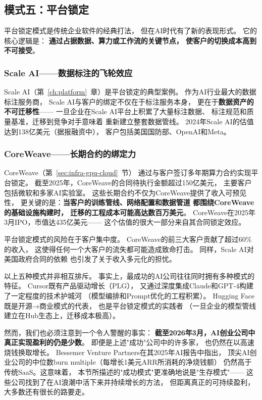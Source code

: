 \subsection{模式五：平台锁定}

平台锁定模式是传统企业软件的经典打法，
但在AI时代有了新的表现形式。
它的核心逻辑是：
\textbf{通过占据数据、算力或工作流的关键节点，
使客户的切换成本高到不可接受}。

\subsubsection{Scale AI——数据标注的飞轮效应}
Scale AI（第~\ref{ch:platform}~章）是平台锁定的典型案例。
作为AI行业最大的数据标注服务商，
Scale AI与客户的绑定不仅在于标注服务本身，
更在于\textbf{数据资产的不可迁移性}——
一旦企业在Scale AI平台上积累了大量标注数据、
标注规范和质量基准，迁移到竞争对手意味着
重新建立整套数据管线。
2024年Scale AI的估值达到138亿美元（据报融资中），
客户包括美国国防部、OpenAI和Meta。

\subsubsection{CoreWeave——长期合约的绑定力}
CoreWeave（第~\ref{sec:infra-gpu-cloud}~节）
通过与客户签订多年期算力合约实现平台锁定。
截至2025年，CoreWeave的合同待执行金额超过150亿美元，
主要客户包括微软和多家AI实验室。
这些长期合约不仅为CoreWeave提供了收入可预见性，
更关键的是：\textbf{当客户的训练管线、网络配置和数据管道
都围绕CoreWeave的基础设施构建时，
迁移的工程成本可能高达数百万美元}。
CoreWeave在2025年3月IPO，市值达435亿美元——
这个估值的很大一部分来自其合同锁定效应。

平台锁定模式的风险在于客户集中度。
CoreWeave的前三大客户贡献了超过60\%的收入，
这使得任何一个大客户的流失都可能造成致命打击。
同样，Scale AI对美国政府合同的依赖
也引发了关于收入多元化的担忧。

\bigskip

以上五种模式并非相互排斥。
事实上，最成功的AI公司往往同时拥有多种模式的特征。
Cursor既有产品驱动增长（PLG），
又通过深度集成Claude和GPT-4构建了一定程度的技术护城河
（模型编排和Prompt优化的工程积累）。
Hugging Face既是开源→商业模式的代表，
也是平台锁定模式的实践者
（一旦企业的模型管线建立在Hub生态上，迁移成本极高）。

然而，我们也必须注意到一个令人警醒的事实：
\textbf{截至2026年3月，AI创业公司中真正实现盈利的仍是少数}。
即便是上述"成功"公司中的许多家，
也仍然在以高速烧钱换取增长。
Bessemer Venture Partners在其2025年AI报告中指出，
顶尖AI创业公司的中位数burn multiple（每增长1美元ARR所消耗的净烧钱额）
仍然高于传统SaaS。这意味着，
本节所描述的"成功模式"更准确地说是"生存模式"——
这些公司找到了在AI浪潮中活下来并持续增长的方法，
但距离真正的可持续盈利，大多数还有很长的路要走。

